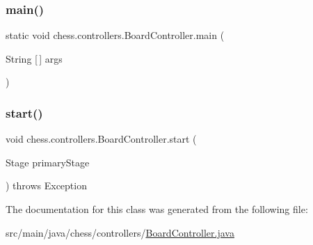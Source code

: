 \subsubsection{\texorpdfstring{main()}{main()}}
{\footnotesize\ttfamily static void chess.\+controllers.\+Board\+Controller.\+main (\begin{DoxyParamCaption}\item[{String \mbox{[}$\,$\mbox{]}}]{args }\end{DoxyParamCaption})\hspace{0.3cm}{\ttfamily [static]}}

\mbox{\label{classchess_1_1controllers_1_1_board_controller_abd589cb5a8d0808c83932ffba970c747}} 
\subsubsection{\texorpdfstring{start()}{start()}}
{\footnotesize\ttfamily void chess.\+controllers.\+Board\+Controller.\+start (\begin{DoxyParamCaption}\item[{Stage}]{primary\+Stage }\end{DoxyParamCaption}) throws Exception}



The documentation for this class was generated from the following file\+:\begin{DoxyCompactItemize}
\item 
src/main/java/chess/controllers/\mbox{\hyperlink{_board_controller_8java}{Board\+Controller.\+java}}\end{DoxyCompactItemize}
